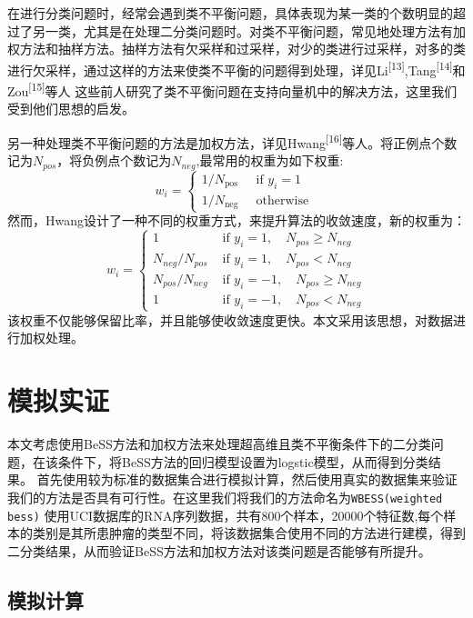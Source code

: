 \documentclass[
]{ctexart}
\newcommand{\passthrough}[1]{#1}
\begin{document}
在进行分类问题时，经常会遇到类不平衡问题，具体表现为某一类的个数明显的超过了另一类，尤其是在处理二分类问题时。对类不平衡问题，常见地处理方法有加权方法和抽样方法。抽样方法有欠采样和过采样，对少的类进行过采样，对多的类进行欠采样，通过这样的方法来使类不平衡的问题得到处理，详见Li\textsuperscript{{[}13{]}},Tang\textsuperscript{{[}14{]}}和Zou\textsuperscript{{[}15{]}}等人
这些前人研究了类不平衡问题在支持向量机中的解决方法，这里我们受到他们思想的启发。

另一种处理类不平衡问题的方法是加权方法，详见Hwang\textsuperscript{{[}16{]}}等人。将正例点个数记为\(N_{pos}\)，将负例点个数记为\(N_{neg}\),最常用的权重为如下权重:
\[
w_{i}=\left\{\begin{array}{ll}
1 / N_{\text {pos }} & \text { if } y_{i}=1 \\
1 / N_{\text {neg }} & \text { otherwise }
\end{array}\right.
\]
然而，Hwang设计了一种不同的权重方式，来提升算法的收敛速度，新的权重为：
\[
w_{i}=\left\{\begin{array}{ll}
1 & \text { if } y_{i}=1, \quad N_{p o s} \geq N_{n e g} \\
N_{n e g} / N_{p o s} & \text { if } y_{i}=1, \quad N_{p o s}<N_{n e g} \\
N_{p o s} / N_{n e g} & \text { if } y_{i}=-1, \quad N_{p o s} \geq N_{n e g} \\
1 & \text { if } y_{i}=-1, \quad N_{p o s}<N_{n e g}
\end{array}\right.
\]
该权重不仅能够保留比率，并且能够使收敛速度更快。本文采用该思想，对数据进行加权处理。

\hypertarget{ux6a21ux62dfux5b9eux8bc1}{%
\section{模拟实证}\label{ux6a21ux62dfux5b9eux8bc1}}

本文考虑使用BeSS方法和加权方法来处理超高维且类不平衡条件下的二分类问题，在该条件下，将BeSS方法的回归模型设置为logstic模型，从而得到分类结果。
首先使用较为标准的数据集合进行模拟计算，然后使用真实的数据集来验证我们的方法是否具有可行性。在这里我们将我们的方法命名为\passthrough{\lstinline!WBESS(weighted bess)!}
使用UCI数据库的RNA序列数据，共有800个样本，20000个特征数,每个样本的类别是其所患肿瘤的类型不同，将该数据集合使用不同的方法进行建模，得到二分类结果，从而验证BeSS方法和加权方法对该类问题是否能够有所提升。

\hypertarget{ux6a21ux62dfux8ba1ux7b97}{%
\subsection{模拟计算}\label{ux6a21ux62dfux8ba1ux7b97}}
\end{document}
